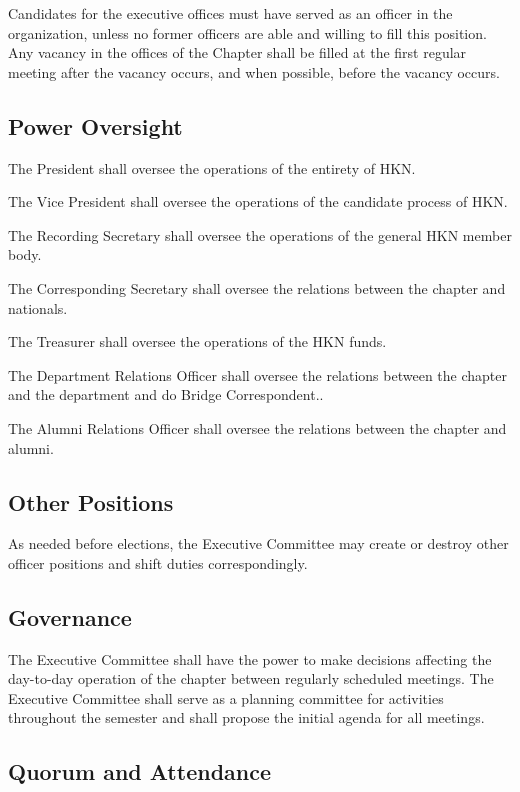 \documentclass[11pt]{article}
\begin{document}
Candidates for the executive offices must have served as an officer in the organization, unless no former officers are able and willing to fill this position.
Any vacancy in the offices of the Chapter shall be filled at the first regular meeting after the vacancy occurs, and when possible, before the vacancy occurs.

\subsection{Power Oversight}
\label{sec:org28692b2}

The President shall oversee the operations of the entirety of HKN.

The Vice President shall oversee the operations of the candidate process of HKN.

The Recording Secretary shall oversee the operations of the general HKN member body.

The Corresponding Secretary shall oversee the relations between the chapter and nationals.

The Treasurer shall oversee the operations of the HKN funds.

The Department Relations Officer shall oversee the relations between the chapter and the department and do Bridge Correspondent..

The Alumni Relations Officer shall oversee the relations between the chapter and alumni.

\subsection{Other Positions}
\label{sec:org438f93d}

As needed before elections, the Executive Committee may create or destroy other officer positions and shift duties correspondingly.

\subsection{Governance}
\label{sec:orgab0b965}

The Executive Committee shall have the power to make decisions affecting the day-to-day operation of the chapter between regularly scheduled meetings.
The Executive Committee shall serve as a planning committee for activities throughout the semester and shall propose the initial agenda for all meetings.

\subsection{Quorum and Attendance}
\label{sec:org7127e60}
\end{document}
